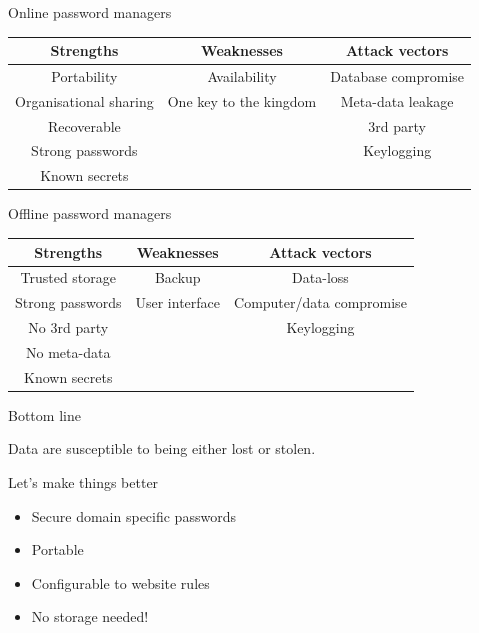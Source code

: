 \documentclass{beamer}
\begin{document}
\begin{frame}{Online password managers}
  \footnotesize
  \begin{table}
    \begin{tabular}{c|c|c}
      \textbf{Strengths} & \textbf{Weaknesses} & \textbf{Attack vectors} \\
      \hline
      Portability & Availability & Database compromise \\
      \hline
      Organisational sharing & One key to the kingdom & Meta-data leakage \\
      \hline
      Recoverable & & 3rd party \\
      \hline
      Strong passwords & & Keylogging \\
      \hline
      Known secrets & & \\
    \end{tabular}
  \end{table}
\end{frame}

\begin{frame}{Offline password managers}
  \footnotesize
  \begin{table}
    \begin{tabular}{c|c|c}
      \textbf{Strengths} & \textbf{Weaknesses} & \textbf{Attack vectors} \\
      \hline
      Trusted storage & Backup & Data-loss \\
      \hline
      Strong passwords & User interface & Computer/data compromise \\
      \hline
      No 3rd party & & Keylogging \\
      \hline
      No meta-data & & \\
      \hline
      Known secrets & & \\
    \end{tabular}
  \end{table}
\end{frame}

\begin{frame}{Bottom line}
  \begin{block}{}
    \begin{center}
      Data are susceptible to being either lost or stolen.
    \end{center}
  \end{block}
\end{frame}

\begin{frame}{Let's make things better}
  \begin{itemize}
    \item Secure domain specific passwords
    \item Portable
    \item Configurable to website rules
    \item {\color{red} No storage needed!}
  \end{itemize}
\end{frame}
\end{document}
